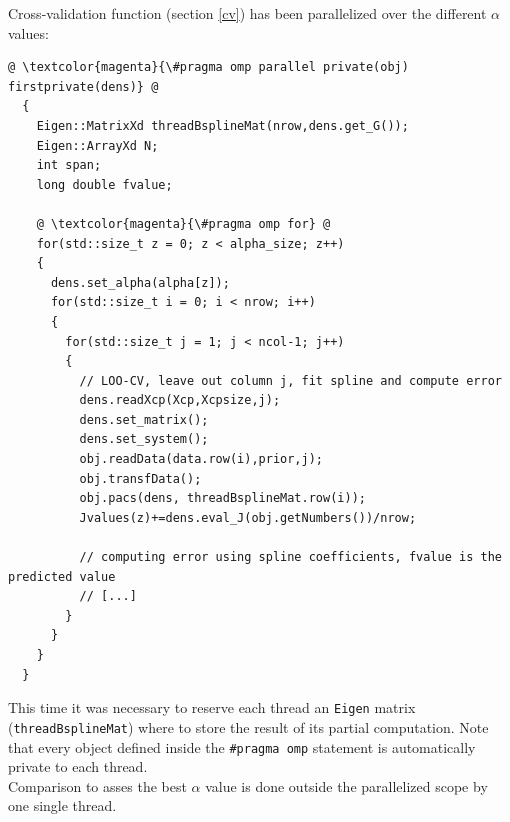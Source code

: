 \medskip

Cross-validation function (section \ref{cv}) has been parallelized over the different $\alpha$ values:

\begin{lstlisting}
@ \textcolor{magenta}{\#pragma omp parallel private(obj) firstprivate(dens)} @
  {
    Eigen::MatrixXd threadBsplineMat(nrow,dens.get_G());
    Eigen::ArrayXd N;
    int span;
    long double fvalue;

    @ \textcolor{magenta}{\#pragma omp for} @
    for(std::size_t z = 0; z < alpha_size; z++)
    {
      dens.set_alpha(alpha[z]);
      for(std::size_t i = 0; i < nrow; i++)
      {
        for(std::size_t j = 1; j < ncol-1; j++) 
        {
          // LOO-CV, leave out column j, fit spline and compute error
          dens.readXcp(Xcp,Xcpsize,j);
          dens.set_matrix();
          dens.set_system();
          obj.readData(data.row(i),prior,j);
          obj.transfData();
          obj.pacs(dens, threadBsplineMat.row(i));
          Jvalues(z)+=dens.eval_J(obj.getNumbers())/nrow;

          // computing error using spline coefficients, fvalue is the predicted value
          // [...]
        }
      }
    }
  }
  \end{lstlisting}

This time it was necessary to reserve each thread an \verb|Eigen| matrix (\verb|threadBsplineMat|) where to store the result of its partial computation. Note that every object defined inside the \verb|#pragma omp| statement is automatically private to each thread. \\ Comparison to asses the best $\alpha$ value is done outside the parallelized scope by one single thread.




